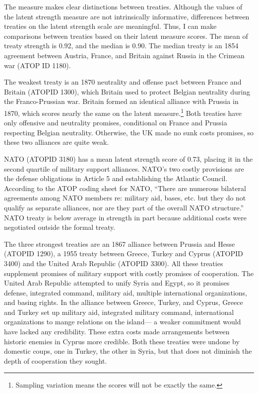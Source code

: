 \documentclass[12pt]{article}
\begin{document}
The measure makes clear distinctions between treaties. 
Although the values of the latent strength measure are not intrinsically informative, differences between treaties on the latent strength scale are meaningful. 
Thus, I can make comparisons between treaties based on their latent measure scores. 
The mean of treaty strength is 0.92, and the median is 0.90. 
The median treaty is an 1854 agreement between Austria, France, and Britain against Russia in the Crimean war (ATOP ID 1180). 


The weakest treaty is an 1870 neutrality and offense pact between France and Britain (ATOPID 1300), which Britain used to protect Belgian neutrality during the Franco-Prussian war.  
Britain formed an identical alliance with Prussia in 1870, which scores nearly the same on the latent measure.\footnote{
Sampling variation means the scores will not be exactly the same.} 
Both treaties have only offensive and neutrality promises, conditional on France and Prussia respecting Belgian neutrality. 
Otherwise, the UK made no sunk costs promises, so these two alliances are quite weak. 


NATO (ATOPID 3180) has a mean latent strength score of 0.73, placing it in the second quartile of military support alliances. 
NATO's two costly provisions are the defense obligations in Article 5 and establishing the Atlantic Council. 
According to the ATOP coding sheet for NATO, ``There are numerous bilateral agreements among NATO members re: military aid, bases, etc. but they do not qualify as separate alliances, nor are they part of the overall NATO structure.''
NATO treaty is below average in strength in part because additional costs were negotiated outside the formal treaty.    


The three strongest treaties are an 1867 alliance between Prussia and Hesse (ATOPID 1290), a 1955 treaty between Greece, Turkey and Cyprus (ATOPID 3400) and the United Arab Republic (ATOPID 3300).  
All these treaties supplement promises of military support with costly promises of cooperation. 
The United Arab Republic attempted to unify Syria and Egypt, so it promises defense, integrated command, military aid, multiple international organizations, and basing rights. 
In the alliance between Greece, Turkey, and Cyprus, Greece and Turkey set up military aid, integrated military command, international organizations to mange relations on the island--- a weaker commitment would have lacked any credibility. 
These extra costs made arrangements between historic enemies in Cyprus more credible. 
Both these treaties were undone by domestic coups, one in Turkey, the other in Syria, but that does not diminish the depth of cooperation they sought. 
\end{document}
